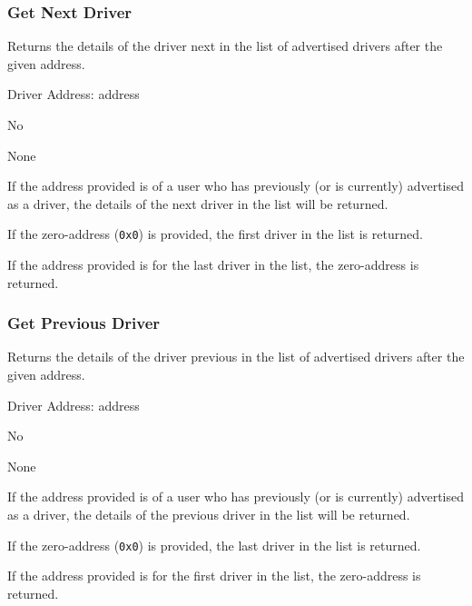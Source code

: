 \subsubsection{Get Next Driver}

\begin{description}[leftmargin=8em,style=nextline]
	\item [Description]
		Returns the details of the driver next in the list of advertised drivers after the given address.
	\item [Arguments]
		Driver Address: address
	\item [Payable]
		No
	\item [Preconditions]
		None
	\item [Postconditions]
		If the address provided is of a user who has previously (or is currently) advertised as a driver, the details of the next driver in the list will be returned.
		
		If the zero-address (\lstinline{0x0}) is provided, the first driver in the list is returned.
		
		If the address provided is for the last driver in the list, the zero-address is returned.
\end{description}

\subsubsection{Get Previous Driver}

\begin{description}[leftmargin=8em,style=nextline]
	\item [Description]
		Returns the details of the driver previous in the list of advertised drivers after the given address.
	\item [Arguments]
		Driver Address: address
	\item [Payable]
		No
	\item [Preconditions]
		None
	\item [Postconditions]
		If the address provided is of a user who has previously (or is currently) advertised as a driver, the details of the previous driver in the list will be returned.
		
		If the zero-address (\lstinline{0x0}) is provided, the last driver in the list is returned.
		
		If the address provided is for the first driver in the list, the zero-address is returned.
\end{description}


